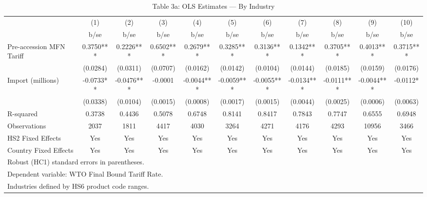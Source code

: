 \begin{table}[htbp]\centering
\def\sym#1{\ifmmode^{#1}\else\(^{#1}\)\fi}
\caption{Table 3a: OLS Estimates --- By Industry}
\begin{tabular}{l*{10}{c}}
\toprule
            &\multicolumn{1}{c}{(1)}   &\multicolumn{1}{c}{(2)}   &\multicolumn{1}{c}{(3)}   &\multicolumn{1}{c}{(4)}   &\multicolumn{1}{c}{(5)}   &\multicolumn{1}{c}{(6)}   &\multicolumn{1}{c}{(7)}   &\multicolumn{1}{c}{(8)}   &\multicolumn{1}{c}{(9)}   &\multicolumn{1}{c}{(10)}   \\
            &        b/se   &        b/se   &        b/se   &        b/se   &        b/se   &        b/se   &        b/se   &        b/se   &        b/se   &        b/se   \\
\midrule
Pre-accession MFN Tariff&      0.3750***&      0.2226***&      0.6502***&      0.2679***&      0.3285***&      0.3136***&      0.1342***&      0.3705***&      0.4013***&      0.3715***\\
            &    (0.0284)   &    (0.0311)   &    (0.0707)   &    (0.0162)   &    (0.0142)   &    (0.0104)   &    (0.0144)   &    (0.0185)   &    (0.0159)   &    (0.0176)   \\
Import (millions)&     -0.0733** &     -0.0476***&     -0.0001   &     -0.0044***&     -0.0059***&     -0.0055***&     -0.0134***&     -0.0111***&     -0.0044***&     -0.0112*  \\
            &    (0.0338)   &    (0.0104)   &    (0.0015)   &    (0.0008)   &    (0.0017)   &    (0.0015)   &    (0.0044)   &    (0.0025)   &    (0.0006)   &    (0.0063)   \\
\midrule
R-squared   &      0.3738   &      0.4436   &      0.5078   &      0.6748   &      0.8141   &      0.8417   &      0.7843   &      0.7747   &      0.6555   &      0.6948   \\
Observations&        2037   &        1811   &        4417   &        4030   &        3264   &        4271   &        4176   &        4293   &       10956   &        3466   \\
HS2 Fixed Effects&         Yes   &         Yes   &         Yes   &         Yes   &         Yes   &         Yes   &         Yes   &         Yes   &         Yes   &         Yes   \\
Country Fixed Effects&         Yes   &         Yes   &         Yes   &         Yes   &         Yes   &         Yes   &         Yes   &         Yes   &         Yes   &         Yes   \\
\bottomrule
\multicolumn{11}{l}{\footnotesize Robust (HC1) standard errors in parentheses.}\\
\multicolumn{11}{l}{\footnotesize Dependent variable: WTO Final Bound Tariff Rate.}\\
\multicolumn{11}{l}{\footnotesize Industries defined by HS6 product code ranges.}\\
\end{tabular}
\end{table}
